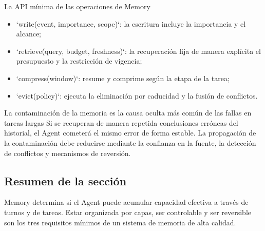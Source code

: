 \begin{knowledgebox}{La API mínima de las operaciones de Memory}
\begin{itemize}
    \item `write(event, importance, scope)`: la escritura incluye la importancia y el alcance;
    \item `retrieve(query, budget, freshness)`: la recuperación fija de manera explícita el presupuesto y la restricción de vigencia;
    \item `compress(window)`: resume y comprime según la etapa de la tarea;
    \item `evict(policy)`: ejecuta la eliminación por caducidad y la fusión de conflictos.
\end{itemize}
\end{knowledgebox}

\begin{warningbox}{La contaminación de la memoria es la causa oculta más común de las fallas en tareas largas}
Si se recuperan de manera repetida conclusiones erróneas del historial, el Agent cometerá el mismo error de forma estable. La propagación de la contaminación debe reducirse mediante la confianza en la fuente, la detección de conflictos y mecanismos de reversión.
\end{warningbox}

\subsection{Resumen de la sección}
Memory determina si el Agent puede acumular capacidad efectiva a través de turnos y de tareas. Estar organizada por capas, ser controlable y ser reversible son los tres requisitos mínimos de un sistema de memoria de alta calidad.


